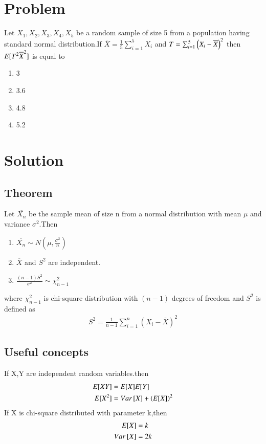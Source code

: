 \documentclass[journal,12pt,twocolumn]{IEEEtran}
\begin{document}
\section{Problem}
Let $X_1,X_2,X_3,X_4,X_5$ be a random sample of size 5 from a population having standard normal distribution.If 
$\overline{X}=\frac{1}{5}\sum_{i=1}^5 X_i$ and $T=\sum_{i=1}^5\left(X_i-\overline{X}\right)^2$
then $E[ T^2\overline{X}^2 ]$ is equal to 
\begin{enumerate}
    \item 3
    \item 3.6
    \item 4.8
    \item 5.2
\end{enumerate}
\section{Solution}
\subsection{Theorem}
Let $\overline{X_n}$ be the sample mean of size n from a normal distribution with mean $\mu$ and variance $\sigma^2$.Then \begin{enumerate}
    \item $\overline{X_n} \sim N(\mu,\frac{\sigma^2}{n})$
    \item $\overline{X}$ and $S^2$ are independent.
    \item $\frac{(n-1)S^2}{\sigma^2} \sim \chi_{n-1}^2$
\end{enumerate} 
where $\chi_{n-1}^2$  is  chi-square distribution
with   $(n-1)$ degrees of freedom and $S^2$ is defined as
\begin{align}
    S^2=\frac{1}{n-1}\sum_{i=1}^{n}(X_i-\overline{X})^2
\end{align}
\subsection{Useful concepts}
If X,Y are independent random variables.then
\begin{align}
    E[ XY ]&=E[ X ]E[ Y ]\\
    E[ X^2 ]&=Var{}\left[X\right]+\left(E[ X ]\right)^2\label{sq}
\end{align}
If X is chi-square distributed with parameter k,then
\begin{align}
    E[ X ]&=k\label{cm}\\
    Var{}\left[X\right]&=2k\label{cv}
\end{align}
\end{document}
